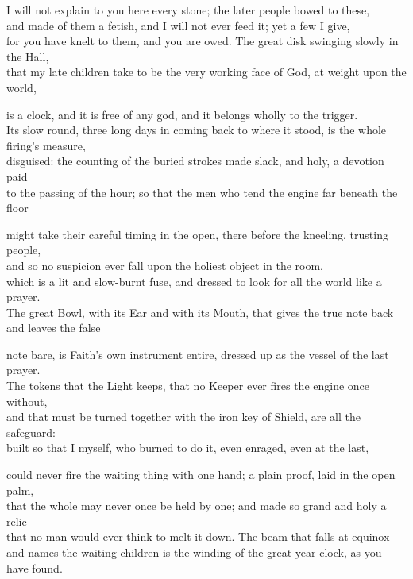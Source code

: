 \ornament

\begin{scripture}
I will not explain to you here every stone; the later people bowed to these, \\
and made of them a fetish, and I will not ever feed it; yet a few I give, \\
for you have knelt to them, and you are owed. The great disk swinging slowly in the Hall, \\
that my late children take to be the very working face of God, at weight upon the world, \\
\medskip

is a clock, and it is free of any god, and it belongs wholly to the trigger. \\
Its slow round, three long days in coming back to where it stood, is the whole firing's measure, \\
disguised: the counting of the buried strokes made slack, and holy, a devotion paid \\
to the passing of the hour; so that the men who tend the engine far beneath the floor \\
\medskip

might take their careful timing in the open, there before the kneeling, trusting people, \\
and so no suspicion ever fall upon the holiest object in the room, \\
which is a lit and slow-burnt fuse, and dressed to look for all the world like a prayer. \\
The great Bowl, with its Ear and with its Mouth, that gives the true note back and leaves the false \\
\medskip

note bare, is Faith's own instrument entire, dressed up as the vessel of the last prayer. \\
The tokens that the Light keeps, that no Keeper ever fires the engine once without, \\
and that must be turned together with the iron key of Shield, are all the safeguard: \\
built so that I myself, who burned to do it, even enraged, even at the last, \\
\medskip

could never fire the waiting thing with one hand; a plain proof, laid in the open palm, \\
that the whole may never once be held by one; and made so grand and holy a relic \\
that no man would ever think to melt it down. The beam that falls at equinox \\
and names the waiting children is the winding of the great year-clock, as you have found. \\
\medskip


\end{scripture}
